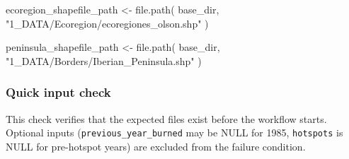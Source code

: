\documentclass[
  british,
  a4paper,
]{scrbook}
\newenvironment{Shaded}{\begin{snugshade}}{\end{snugshade}}
\newcommand{\FunctionTok}[1]{\textcolor[rgb]{0.28,0.35,0.67}{#1}}
\newcommand{\NormalTok}[1]{\textcolor[rgb]{0.00,0.23,0.31}{#1}}
\newcommand{\OtherTok}[1]{\textcolor[rgb]{0.00,0.23,0.31}{#1}}
\newcommand{\StringTok}[1]{\textcolor[rgb]{0.13,0.47,0.30}{#1}}
\begin{document}
\begin{Shaded}
\begin{Highlighting}[]
\NormalTok{ecoregion\_shapefile\_path }\OtherTok{\textless{}{-}} \FunctionTok{file.path}\NormalTok{(}
\NormalTok{  base\_dir,}
  \StringTok{"1\_DATA/Ecoregion/ecoregiones\_olson.shp"}
\NormalTok{)}

\NormalTok{peninsula\_shapefile\_path }\OtherTok{\textless{}{-}} \FunctionTok{file.path}\NormalTok{(}
\NormalTok{  base\_dir,}
  \StringTok{"1\_DATA/Borders/Iberian\_Peninsula.shp"}
\NormalTok{)}
\end{Highlighting}
\end{Shaded}

\subsubsection{Quick input check}\label{quick-input-check}

This check verifies that the expected files exist before the workflow
starts. Optional inputs (\texttt{previous\_year\_burned} may be NULL for
1985, \texttt{hotspots} is NULL for pre-hotspot years) are excluded from
the failure condition.
\end{document}
